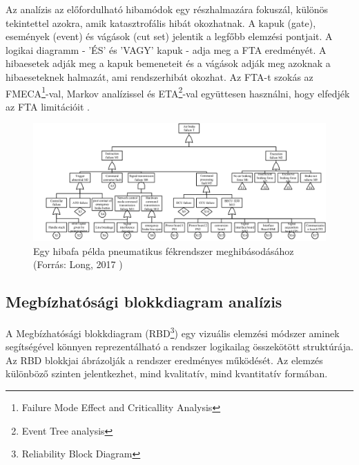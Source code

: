 Az analízis az előfordulható hibamódok egy részhalmazára fokuszál, különös tekintettel azokra, amik katasztrofális hibát okozhatnak.
A kapuk (gate), események (event) és vágások (cut set) jelentik a legfőbb elemzési pontjait.
A logikai diagramm - 'ÉS' és 'VAGY' kapuk - adja meg a FTA eredményét.
A hibaesetek adják meg a kapuk bemeneteit és a vágások adják meg azoknak a hibaeseteknek halmazát, ami rendszerhibát okozhat.
Az FTA-t szokás az FMECA\footnote{Failure Mode Effect and Criticallity Analysis}-val, Markov analízissel és ETA\footnote{Event Tree analysis}-val együttesen használni, hogy elfedjék az FTA limitációit \cite{60812}.

\begin{figure}
    \footnotesize
    \centering
    \includegraphics[width=150mm, keepaspectratio]{figures/fta1.png}
    \caption{Egy hibafa példa pneumatikus fékrendszer meghibásodásához (Forrás: Long, 2017 \cite{Long2017BrakingSM})}
\end{figure}

\subsection{Megbízhatósági blokkdiagram analízis}
A Megbízhatósági blokkdiagram (RBD\footnote{Reliability Block Diagram}) egy vizuális elemzési módszer aminek segítségével könnyen reprezentálható a rendszer logikailag összekötött struktúrája.
Az RBD blokkjai ábrázolják a rendszer eredményes működését. Az elemzés különböző szinten jelentkezhet, mind kvalitatív, mind kvantitatív formában. \cite{61078,en60300-3-1}


